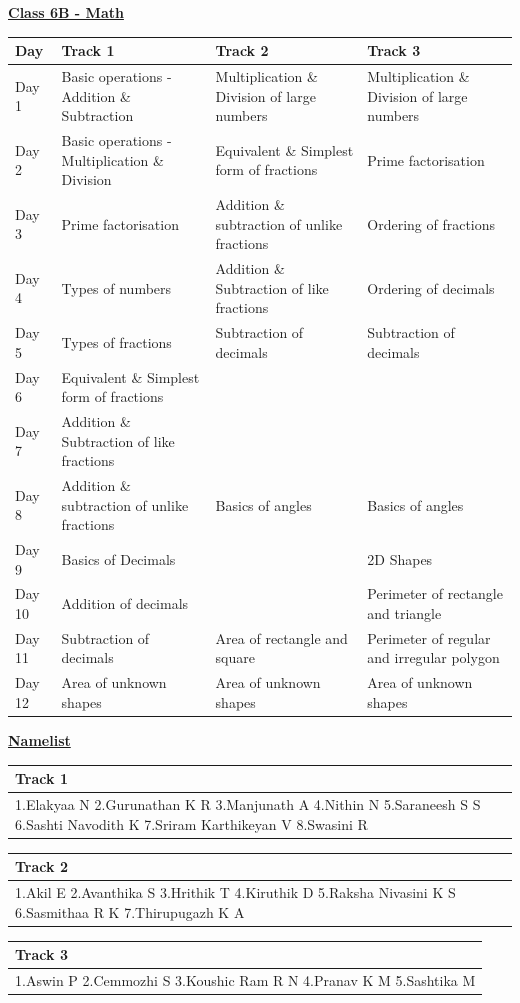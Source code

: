 \documentclass[12pt,a4paper]{article}
\newcommand{\namelisttable}[5]{
\renewcommand{\arraystretch}{#1}
\normalsize
\begin{tabular}{|>{\RaggedRight\arraybackslash} m{#2cm}|}
\hline
\rowcolor{#3} \textbf{#4} \\
\hline
#5\\
\hline
\end{tabular}
\vspace{0.2cm}
}
\newcommand{\sixBMathPlan}{
\renewcommand{\arraystretch}{1.5} 
\centering
\begin{tabular}{|>{\centering\arraybackslash}m{1.5cm}|>{\centering\arraybackslash}m{5cm}|>{\centering\arraybackslash}m{5cm}|>{\centering\arraybackslash}m{5cm}|}
\hline
\rowcolor{pink!50} \textbf{Day} & \textbf{Track 1} & \textbf{Track 2} & \textbf{Track 3} \\
\hline
Day 1  & Basic operations - Addition \& Subtraction & Multiplication \& Division of large numbers & Multiplication \& Division of large numbers \\
\hline
Day 2  & Basic operations - Multiplication \& Division & Equivalent \& Simplest form of fractions & Prime factorisation \\
\hline
Day 3  & Prime factorisation & Addition \& subtraction of unlike fractions & Ordering of fractions \\
\hline
Day 4  & Types of numbers & Addition \& Subtraction of like fractions & Ordering of decimals \\
\hline
Day 5  & Types of fractions & Subtraction of decimals & Subtraction of decimals \\
\hline
Day 6  & Equivalent \& Simplest form of fractions & \multirow{2}{5cm}{\centering  Addition \& Subtraction of integers} & \multirow{2}{5cm}{\centering Basics of algebra} \\
\cline{1-2}
Day 7  & Addition \& Subtraction of like fractions &  &  \\
\hline
Day 8  & Addition \& subtraction of unlike fractions & Basics of angles & Basics of angles \\
\hline
Day 9  & Basics of Decimals & \multirow{2}{5cm}{\centering Basics of algebra }& 2D Shapes \\
\cline{1-2}\cline{4-4}
Day 10 & Addition of decimals &  & Perimeter of rectangle and triangle \\
\hline
Day 11 & Subtraction of decimals & Area of rectangle and square & Perimeter of regular and irregular polygon \\
\hline
Day 12 & Area of unknown shapes & Area of unknown shapes & Area of unknown shapes \\
\hline
\end{tabular}

}
\newcommand{\heading}[1]{\centering \underline{\textbf{\Large  #1}} }
\begin{document}
\heading{Class 6B  - Math}\\
\vspace{0.75cm}
\sixBMathPlan
\vspace{1cm}
\heading{Namelist}
\begin{multicols}{3}
\namelisttable{1.5}{5}{pink!40}{Track 1}{1.Elakyaa N\newline
2.Gurunathan K R\newline
3.Manjunath A\newline
4.Nithin N\newline
5.Saraneesh S S\newline
6.Sashti Navodith K\newline
7.Sriram Karthikeyan V\newline
8.Swasini R}


\namelisttable{1.5}{5}{pink!40}{Track 2}{1.Akil E\newline
2.Avanthika S\newline
3.Hrithik T\newline
4.Kiruthik D\newline
5.Raksha Nivasini K S\newline
6.Sasmithaa R K\newline
7.Thirupugazh K A}


\namelisttable{1.5}{5}{pink!40}{Track 3}{1.Aswin P\newline
2.Cemmozhi S\newline
3.Koushic Ram R N\newline
4.Pranav K M\newline
5.Sashtika M}


\end{multicols}
\end{document}
